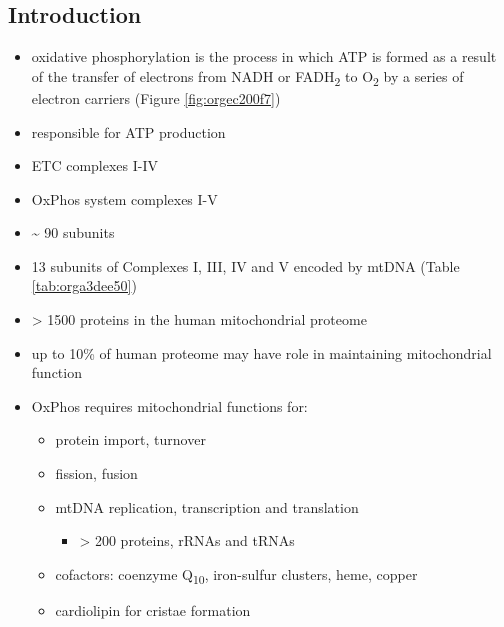 \documentclass{scrartcl}
\begin{document}
\subsection{Introduction}
\label{sec:orgbd23bc9}
\begin{itemize}
\item oxidative phosphorylation is the process in which ATP is formed as a
result of the transfer of electrons from NADH or FADH\textsubscript{2} to O\textsubscript{2} by a
series of electron carriers (Figure \ref{fig:orgec200f7})
\item responsible for ATP production
\item ETC complexes I-IV
\item OxPhos system complexes I-V
\item \textasciitilde{} 90 subunits
\item 13 subunits of Complexes I, III, IV and V encoded by mtDNA (Table \ref{tab:orga3dee50})
\item \textgreater{} 1500 proteins in the human mitochondrial proteome
\item up to 10\% of human proteome may have role in maintaining mitochondrial function
\item OxPhos requires mitochondrial functions for:
\begin{itemize}
\item protein import, turnover
\item fission, fusion
\item mtDNA replication, transcription and translation
\begin{itemize}
\item \textgreater{} 200 proteins, rRNAs and tRNAs
\end{itemize}
\item cofactors: coenzyme Q\textsubscript{10}, iron-sulfur clusters, heme, copper
\item cardiolipin for cristae formation
\end{itemize}


\end{itemize}
\end{document}
